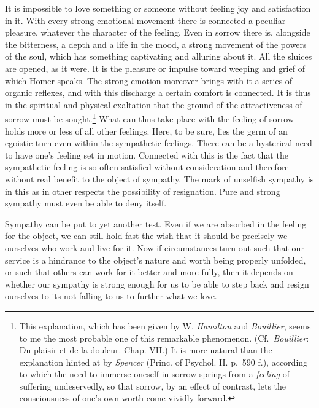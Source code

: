 \documentclass[12pt,a4paper]{book}
\newcommand{\opage}[1]{\marginnote{\footnotesize\textit{[#1]}}}
\begin{document}
It is impossible to love something or someone without feeling joy and
satisfaction in it. With every strong emotional movement there is
connected a peculiar pleasure, whatever the character of the feeling.
Even in sorrow there is, alongside the bitterness, a depth and a life in
the mood, a strong movement of the powers of the soul, which has
something captivating and alluring about it. All the sluices are opened,
as it were. It is the pleasure or impulse toward weeping and grief of
which Homer speaks. The strong emotion moreover brings with it a series
of organic reflexes, and with this discharge a certain comfort is
connected. It is thus in the spiritual and physical exaltation that the
ground of the attractiveness of
sorrow must be sought.\footnote{This explanation, which has been given
by W. \emph{Hamilton} and \emph{Bouillier}, seems to me the most
probable one of this remarkable phenomenon. (Cf.\ \emph{Bouillier}: Du
plaisir et de la douleur. Chap. VII.) It is more natural than the
explanation hinted at by \emph{Spencer} (Princ. of Psychol. II. p.~590
f.), according to which the need to immerse oneself in sorrow springs
from a \emph{feeling} of suffering undeservedly, so that sorrow, by an
effect of contrast, lets the consciousness of one's own worth come
vividly forward.}
\opage{309}What can thus take place with the feeling of sorrow holds more
or less of all other feelings. Here, to be sure, lies the germ of an
egoistic turn even within the sympathetic feelings. There can be a
hysterical need to have one's feeling set in motion. Connected with this
is the fact that the sympathetic feeling is so often satisfied without
consideration and therefore without real benefit to the object of
sympathy. The mark of unselfish sympathy is in this as in other respects
the possibility of resignation. Pure and strong sympathy must even be
able to deny itself.

Sympathy can be put to yet another test. Even if we are absorbed in the
feeling for the object, we can still hold fast the wish that it should
be precisely we ourselves who work and live for it. Now if circumstances
turn out such that our service is a hindrance to the object's nature
and worth being properly unfolded, or such that others can work for it
better and more fully, then it depends on whether our sympathy is strong
enough for us to be able to step back and resign ourselves to its not
falling to us to further what we love.
\end{document}
